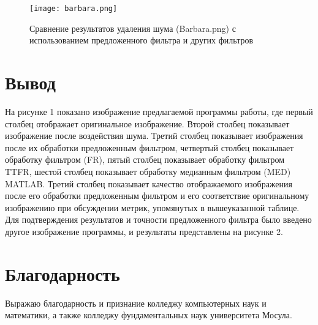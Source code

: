 \begin{figure}[H]
    \centering
    \texttt{[image: barbara.png]}
    \caption{Сравнение результатов удаления шума (Barbara.png) 
    с использованием предложенного фильтра и других фильтров}
\end{figure}

\section{Вывод}

На рисунке 1 показано изображение предлагаемой программы работы, где первый
столбец отображает оригинальное изображение. Второй столбец показывает
изображение после воздействия шума. Третий столбец показывает изображения после
их обработки предложенным фильтром, четвертый столбец показывает обработку
фильтром (FR), пятый столбец показывает обработку фильтром TTFR, шестой столбец
показывает обработку медианным фильтром (MED) MATLAB. Третий столбец показывает
качество отображаемого изображения после его обработки предложенным фильтром и
его соответствие оригинальному изображению при обсуждении метрик, упомянутых в
вышеуказанной таблице. Для подтверждения результатов и точности предложенного
фильтра было введено другое изображение программы, и результаты представлены на
рисунке 2.

\section{Благодарность}

Выражаю благодарность и признание колледжу компьютерных наук и математики, а
также колледжу фундаментальных наук университета Мосула.

\newpage
\printbibliography[heading=bibintoc]


